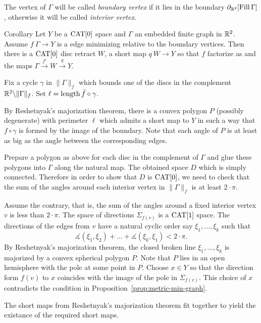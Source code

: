 \documentclass{article}
\begin{document}
The vertex of $\Gamma$ will be called \emph{boundary vertex}
if it lies in the boundary $\partial_{\mathbb{R}^2}[\mathop{\rm Fill}\Gamma]$,
otherwise it will be called \emph{interior vertex}.

\begin{thm}{Corollary}\label{cor:planar-minimizing-graph}
Let $Y$ be a $\mathop{\rm CAT}\nolimits[0]$ space and
$\Gamma$ an embedded finite graph in $\mathbb{R}^2$.
Assume $f\:\Gamma\to Y$ is a edge minimizing relative to the boundary vertices. 
Then there is a $\mathop{\rm CAT}\nolimits[0]$ disc retract $W$,
a short map $q\:W\to Y$ so that $f$ factorize as
and the maps $\Gamma\xrightarrow{f'} W \xrightarrow{q} Y$.
\end{thm}


Fix a cycle $\gamma$ in $\|\Gamma\|_f$ which bounds one of the discs in the complement $\mathbb{R}^2\backslash \|\Gamma\|_f$.
Set $\ell=\mathop{\rm length}\nolimits \bar f\circ\gamma$.

By Reshetnyak's majorization theorem, there is a convex polygon $P$ (possibly degenerate) with perimeter $\ell$ which admits 
a short map to $Y$ in such a way that $f\circ\gamma$ is formed by the image of the boundary.
Note that each angle of $P$ is at least as big as 
the angle between the corresponding edges.

Prepare a polygon as above for each disc in the complement of $\Gamma$
and glue these polygons into $\Gamma$ along the natural map.
The obtained space $D$ which is simply connected.
Therefore in order to show that $D$ is $\mathop{\rm CAT}\nolimits[0]$,
we need to check that the sum of the angles around each interior vertex in $\|\Gamma\|_f$ is at least $2\cdot\pi$.


Assume the contrary, that is, 
the sum of the angles around a fixed interior vertex $v$ is less than $2\cdot\pi$.
The space of directions $\Sigma_{f(v)}$ is a $\mathop{\rm CAT}\nolimits[1]$ space.
The directions of the edges from $v$ have a natural
cyclic order say $\xi_1,\dots,\xi_k$
such that
\[\measuredangle(\xi_1,\xi_2)+\dots+\measuredangle(\xi_k,\xi_1)<2\cdot\pi.\]
By Reshetnyak's majorization theorem,
the closed broken line $\xi_1,\dots,\xi_k$ is majorized by a convex spherical polygon $P$.
Note that $P$ lies in an open hemisphere with the pole  at some point in $P$.
Choose $x\in Y$ so that the direction form $f(v)$ to $x$ coincides with the image of the pole in $\Sigma_{f(v)}$.
This choice of $x$ contradicts the condition in Proposition~\ref{prop:metric-min-graph}.

The short maps from Reshetnyak's majorization theorem fit together to yield the existance of the required short maps.
\qeds
\end{document}
